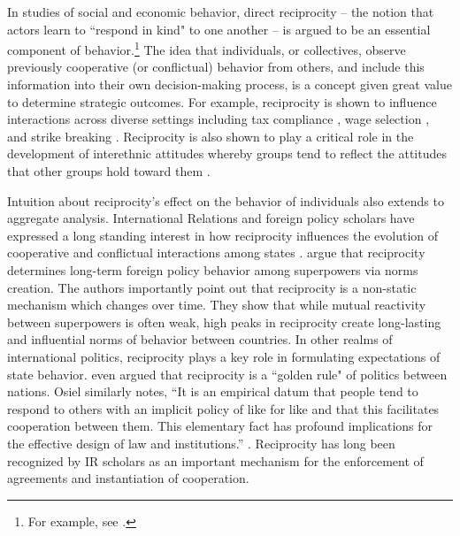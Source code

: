  In studies of social and economic behavior, direct reciprocity -- the notion that actors learn to ``respond in kind" to one another -- is argued to be an essential component of behavior.\footnote{For example, see \cite{bolton:1998, charness:2002, charness:2004, cox:2007, cox:2004}.} The idea that individuals, or collectives, observe previously cooperative (or conflictual) behavior from others, and include this information into their own decision-making process, is a concept given great value to determine strategic outcomes. For example, reciprocity is shown to influence interactions across diverse settings including tax compliance \citep{smith:1990}, wage selection \citep{campbell:1997}, and strike breaking \citep{brett:1998}. Reciprocity is also shown to play a critical role in the development of interethnic attitudes whereby groups tend to reflect the attitudes that other groups hold toward them \citep{berry:1979}. 

Intuition about reciprocity's effect on the behavior of individuals also extends to aggregate analysis. International Relations and foreign policy scholars have expressed a long standing interest in how reciprocity influences the evolution of cooperative and conflictual interactions among states \citep{richardson1960, keohane1989reciprocity}. \cite{rajmaira:1990} argue that reciprocity determines long-term foreign policy behavior among superpowers via norms creation. The authors importantly point out that reciprocity is a non-static mechanism which changes over time. They show that while mutual reactivity between superpowers is often weak, high peaks in reciprocity create long-lasting and influential norms of behavior between countries. In other realms of international politics, reciprocity plays a key role in formulating expectations of state behavior. \cite{ward1981} even argued that reciprocity is a ``golden rule" of politics between nations.  Osiel similarly notes, ``It is an empirical datum that people tend to respond to others with an implicit policy of like for like and that this facilitates cooperation between them. This elementary fact has profound implications for the effective design of law and institutions.'' \cite[p. 19]{osiel:2009}. Reciprocity has long been recognized by IR scholars as an important mechanism for the enforcement of agreements and instantiation of cooperation. 

